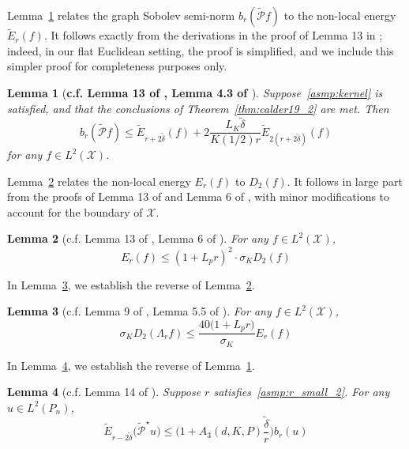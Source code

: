 \documentclass{article}
\newcommand{\1}{\mathbf{1}}
\newcommand{\Xset}{\mathcal{X}}
\newcommand{\Leb}{L}
\newcommand{\mc}[1]{\mathcal{#1}}
\newcommand{\wt}[1]{\widetilde{#1}}
\theoremstyle{alden}
\theoremstyle{aldenthm}
\newtheorem{lemma}{Lemma}
\theoremstyle{definition}
\theoremstyle{remark}
\begin{document}
Lemma~\ref{lem:first_order_graph_sobolev_seminorm_discretized} relates the graph Sobolev semi-norm $b_r(\wt{\mc{P}}f)$ to the non-local energy $\wt{E}_r(f)$. It follows exactly from the derivations in the proof of Lemma 13 in \cite{trillos2019}; indeed, in our flat Euclidean setting, the proof is simplified, and we include this simpler proof for completeness purposes only.
\begin{lemma}[\textbf{c.f. Lemma 13 of \cite{trillos2019}, Lemma 4.3 of \cite{burago2014}}]
	\label{lem:first_order_graph_sobolev_seminorm_discretized}
	Suppose~\ref{asmp:kernel} is satisfied, and that the conclusions of Theorem~\ref{thm:calder19_2} are met. Then
	\begin{equation*}
	b_r(\wt{\mc{P}}f) \leq \wt{E}_{r + 2\wt{\delta}}(f) + 2\frac{L_K\wt{\delta}}{K(1/2)r} \wt{E}_{2(r + 2\wt{\delta})}(f)
	\end{equation*}
	for any $f \in \Leb^2(\Xset)$.
\end{lemma}

Lemma~\ref{lem:first_order_graph_sobolev_seminorm_expected} relates the non-local energy $E_r(f)$ to $D_2(f)$. It follows in large part from the proofs of Lemma 13 of \cite{trillos2019} and Lemma 6 of \cite{burago2014}, with minor modifications to account for the boundary of $\Xset$.
\begin{lemma}[c.f. Lemma 13 of \cite{trillos2019}, Lemma 6 of \cite{burago2014}]
	\label{lem:first_order_graph_sobolev_seminorm_expected}
	For any $f \in \Leb^2(\Xset)$,
	\begin{equation*}
	E_r(f) \leq (1 + L_pr)^2 \cdot \sigma_K D_2(f)
	\end{equation*}
\end{lemma}

In Lemma~\ref{lem:first_order_graph_sobolev_seminorm_expected_lb}, we establish the reverse of Lemma~\ref{lem:first_order_graph_sobolev_seminorm_expected}. 
\begin{lemma}[c.f. Lemma 9 of \cite{trillos2019}, Lemma 5.5 of \cite{burago2014}]
	\label{lem:first_order_graph_sobolev_seminorm_expected_lb}
	For any $f \in \Leb^2(\Xset)$,
	\begin{equation*}
	\sigma_KD_2(\Lambda_rf) \leq \frac{40 \bigl(1 + L_p r\bigr)}{\sigma_K}E_r(f)
	\end{equation*}
\end{lemma}

In Lemma~\ref{lem:first_order_graph_sobolev_seminorm_discretized_lb}, we establish the reverse of Lemma~\ref{lem:first_order_graph_sobolev_seminorm_discretized}. 
\begin{lemma}[c.f. Lemma 14 of \cite{trillos2019}]
	\label{lem:first_order_graph_sobolev_seminorm_discretized_lb}
	Suppose $r$ satisfies~\ref{asmp:r_small_2}. For any $u \in \Leb^2(P_n)$, 
	\begin{equation*}
	\wt{E}_{r - 2\wt{\delta}}\bigl(\wt{\mc{P}}^{\star}u\bigr) \leq \biggl(1 + A_3(d,K,P)\frac{\wt{\delta}}{r}\biggr) b_{r}(u)
	\end{equation*}
\end{lemma}
\end{document}
